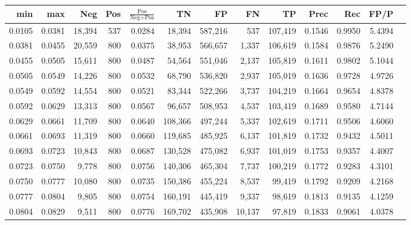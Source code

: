 \begin{tabular}{rrrrrrrrrrrrr}
\toprule
   min &    max &    Neg & Pos & $\frac{\text{Pos}}{\text{Neg}+\text{Pos}}$ &      TN &      FP &      FN &      TP &   Prec &    Rec &   FP/P \\
\midrule
0.0105 & 0.0381 & 18,394 & 537 &                                     0.0284 &  18,394 & 587,216 &     537 & 107,419 & 0.1546 & 0.9950 & 5.4394 \\
0.0381 & 0.0455 & 20,559 & 800 &                                     0.0375 &  38,953 & 566,657 &   1,337 & 106,619 & 0.1584 & 0.9876 & 5.2490 \\
0.0455 & 0.0505 & 15,611 & 800 &                                     0.0487 &  54,564 & 551,046 &   2,137 & 105,819 & 0.1611 & 0.9802 & 5.1044 \\
0.0505 & 0.0549 & 14,226 & 800 &                                     0.0532 &  68,790 & 536,820 &   2,937 & 105,019 & 0.1636 & 0.9728 & 4.9726 \\
0.0549 & 0.0592 & 14,554 & 800 &                                     0.0521 &  83,344 & 522,266 &   3,737 & 104,219 & 0.1664 & 0.9654 & 4.8378 \\
0.0592 & 0.0629 & 13,313 & 800 &                                     0.0567 &  96,657 & 508,953 &   4,537 & 103,419 & 0.1689 & 0.9580 & 4.7144 \\
0.0629 & 0.0661 & 11,709 & 800 &                                     0.0640 & 108,366 & 497,244 &   5,337 & 102,619 & 0.1711 & 0.9506 & 4.6060 \\
0.0661 & 0.0693 & 11,319 & 800 &                                     0.0660 & 119,685 & 485,925 &   6,137 & 101,819 & 0.1732 & 0.9432 & 4.5011 \\
0.0693 & 0.0723 & 10,843 & 800 &                                     0.0687 & 130,528 & 475,082 &   6,937 & 101,019 & 0.1753 & 0.9357 & 4.4007 \\
0.0723 & 0.0750 &  9,778 & 800 &                                     0.0756 & 140,306 & 465,304 &   7,737 & 100,219 & 0.1772 & 0.9283 & 4.3101 \\
0.0750 & 0.0777 & 10,080 & 800 &                                     0.0735 & 150,386 & 455,224 &   8,537 &  99,419 & 0.1792 & 0.9209 & 4.2168 \\
0.0777 & 0.0804 &  9,805 & 800 &                                     0.0754 & 160,191 & 445,419 &   9,337 &  98,619 & 0.1813 & 0.9135 & 4.1259 \\
0.0804 & 0.0829 &  9,511 & 800 &                                     0.0776 & 169,702 & 435,908 &  10,137 &  97,819 & 0.1833 & 0.9061 & 4.0378 \\

\end{tabular}
